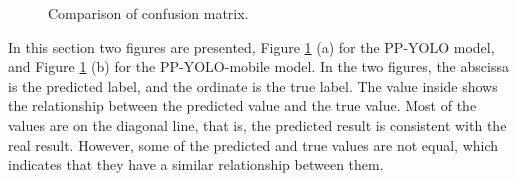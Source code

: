 \documentclass[sensors,article,submit,moreauthors,pdftex]{Definitions/mdpi}
\begin{document}
\begin{paracol}{2}
\begin{figure}[htbp]
\centering
{}
\quad
{}
\caption{Comparison of confusion matrix.}
\label{fig:confusion matrix}
\end{figure}

In this section two figures are presented, Figure \ref{fig:confusion matrix} (a) for the PP-YOLO model, and Figure \ref{fig:confusion matrix} (b) for the PP-YOLO-mobile model. In the two figures, the abscissa is the predicted label, and the ordinate is the true label. The value inside shows the relationship between the predicted value and the true value. Most of the values are on the diagonal line, that is, the predicted result is consistent with the real result. However, some of the predicted and true values are not equal, which indicates that they have a similar relationship between them.


\end{paracol}
\end{document}

